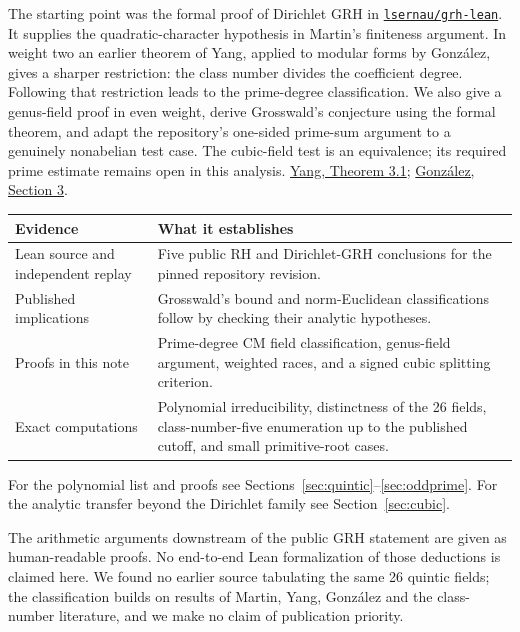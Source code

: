 \documentclass[10pt,letterpaper]{article}
\begin{document}
\medskip\noindent
The starting point was the formal proof of Dirichlet GRH in
\href{https://github.com/lsernau/grh-lean/tree/72fead102f663d5c7a407964a13dc0cf9d977207}{\texttt{lsernau/grh-lean}}.
It supplies the quadratic-character hypothesis in Martin's finiteness argument.
In weight two an earlier theorem of Yang, applied to modular forms by
Gonz\'alez, gives a sharper restriction: the class number divides the
coefficient degree. Following that restriction leads to the prime-degree
classification. We also give a genus-field proof in even weight, derive
Grosswald's conjecture using the formal theorem, and adapt the repository's
one-sided prime-sum argument to a genuinely nonabelian test case.
The cubic-field test is an equivalence; its required prime estimate remains open
in this analysis. \href{https://arxiv.org/pdf/math/0301306}{Yang, Theorem 3.1};
\href{https://ems.press/content/serial-article-files/38349}{Gonz\'alez, Section 3}.
\medskip
\begin{center}\small
\begin{tabular}{p{.22\linewidth}p{.68\linewidth}}
\toprule
\textbf{Evidence} & \textbf{What it establishes}\\
\midrule
Lean source and independent replay & Five public RH and Dirichlet-GRH conclusions for the pinned repository revision.\\[3pt]
Published implications & Grosswald's bound and norm-Euclidean classifications follow by checking their analytic hypotheses.\\[3pt]
Proofs in this note & Prime-degree CM field classification, genus-field argument, weighted races, and a signed cubic splitting criterion.\\[3pt]
Exact computations & Polynomial irreducibility, distinctness of the 26 fields, class-number-five enumeration up to the published cutoff, and small primitive-root cases.\\
\bottomrule
\end{tabular}
\end{center}
\medskip\noindent
For the polynomial list and proofs see Sections~\ref{sec:quintic}--\ref{sec:oddprime}.
For the analytic transfer beyond the Dirichlet family see Section~\ref{sec:cubic}.

\medskip\noindent The arithmetic arguments downstream of the public GRH statement are given
as human-readable proofs. No end-to-end Lean formalization of those deductions
is claimed here. We found no earlier source tabulating the same 26 quintic
fields; the classification builds on results of Martin, Yang, Gonz\'alez
and the class-number literature, and we make no claim of publication priority.
\clearpage
\end{document}
